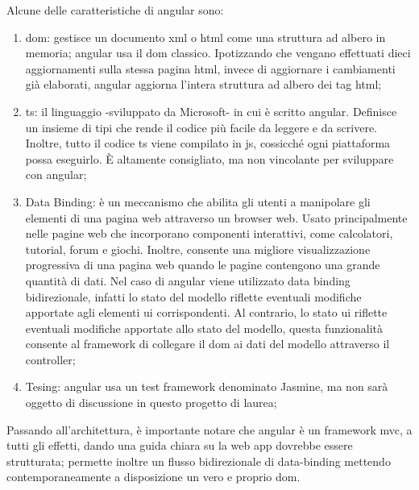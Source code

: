 Alcune delle caratteristiche di \gls{angular} sono:
\begin{enumerate}
    \item \acrfull{dom}: gestisce un documento \acrshort{xml} o \acrshort{html} come una struttura ad albero in memoria; \gls{angular} usa il \acrshort{dom} classico. Ipotizzando che vengano effettuati dieci aggiornamenti sulla stessa pagina \acrshort{html}, invece di aggiornare i cambiamenti già elaborati, \gls{angular} aggiorna l'intera struttura ad albero dei tag \acrshort{html};
    \item \acrfull{ts}: il linguaggio -sviluppato da Microsoft- in cui è scritto \gls{angular}. Definisce un insieme di tipi che rende il codice più facile da leggere e da scrivere. Inoltre, tutto il codice \acrlong{ts} viene compilato in \acrlong{js}, cossicché ogni piattaforma possa eseguirlo. È altamente consigliato, ma non vincolante per sviluppare con \gls{angular};
    \item Data Binding: è un meccanismo che abilita gli utenti a manipolare gli elementi di una pagina web attraverso un browser web. Usato principalmente nelle pagine web che incorporano componenti interattivi, come calcolatori, tutorial, forum e giochi. Inoltre, consente una migliore visualizzazione progressiva di una pagina web quando le pagine contengono una grande quantità di dati. Nel caso di \gls{angular} viene utilizzato data binding bidirezionale, infatti lo stato del modello riflette eventuali modifiche apportate agli elementi \acrshort{ui} corrispondenti. Al contrario, lo stato \acrshort{ui} riflette eventuali modifiche apportate allo stato del modello, questa funzionalità consente al \gls{framework} di collegare il \acrshort{dom} ai dati del modello attraverso il controller;
    \item Tesing: \gls{angular} usa un test \gls{framework} denominato Jasmine, ma non sarà oggetto di discussione in questo progetto di laurea;
\end{enumerate}

Passando all'architettura, è importante notare che \gls{angular} è un \gls{framework} \acrlong{mvc}, a tutti gli effetti, dando una guida chiara su la web app dovrebbe essere strutturata; permette inoltre un flusso bidirezionale di data-binding mettendo contemporaneamente a disposizione un vero e proprio \acrshort{dom}.

